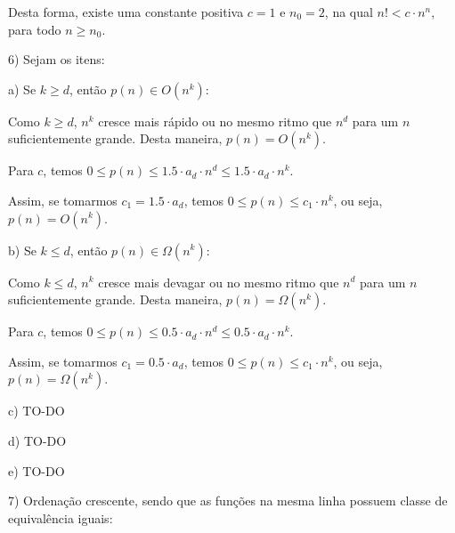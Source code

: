 \documentclass[]{article}
\begin{document}
Desta forma, existe uma constante positiva $c=1$ e $n_0=2$, na qual $n! < c \cdot n^n$, para todo $n \geq n_0$.

\vspace{1cm}

6) Sejam os itens:

\vspace{0.5cm}

a) Se $ k \geq d$, então $p(n) \in O(n^k)$:

Como $k \geq d$, $n^k$ cresce mais rápido ou no mesmo ritmo que $n^d$ para um $n$ suficientemente grande. Desta maneira, $p(n) = O(n^k)$. 

Para $c$, temos $0 \leq p(n) \leq 1.5 \cdot a_d \cdot n^d \leq 1.5 \cdot a_d \cdot n^k$.

Assim, se tomarmos $c_1 = 1.5 \cdot a_d$, temos $0 \leq p(n) \leq c_1 \cdot n^k$, ou seja, $p(n) = O(n^k)$.

\vspace{0.5cm}

b) Se $ k \leq d$, então $p(n) \in \Omega(n^k)$:

Como $k \leq d$, $n^k$ cresce mais devagar ou no mesmo ritmo que $n^d$ para um $n$ suficientemente grande. Desta maneira, $p(n) = \Omega(n^k)$. 

Para $c$, temos $0 \leq p(n) \leq 0.5 \cdot a_d \cdot n^d \leq 0.5 \cdot a_d \cdot n^k$.

Assim, se tomarmos $c_1 = 0.5 \cdot a_d$, temos $0 \leq p(n) \leq c_1 \cdot n^k$, ou seja, $p(n) = \Omega(n^k)$.

\vspace{0.5cm}

c) TO-DO

d) TO-DO

e) TO-DO

\newpage

7) Ordenação crescente, sendo que as funções na mesma linha possuem classe de equivalência iguais:
\end{document}

